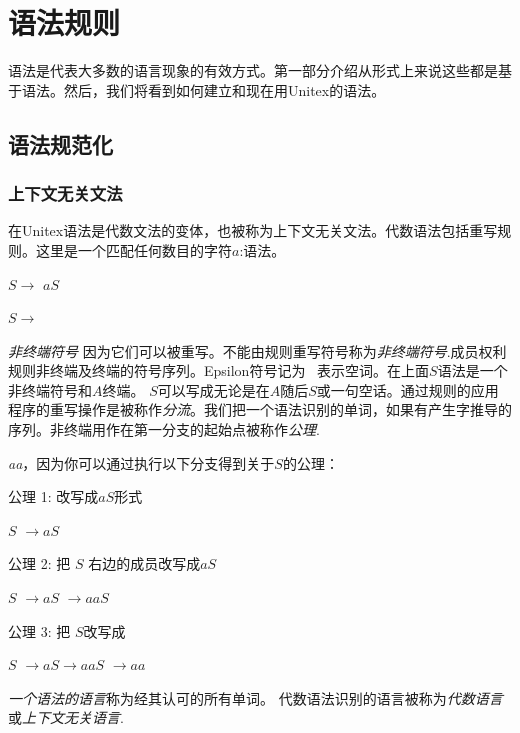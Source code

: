 \chapter{语法规则}
\label{chap-grammars}

语法是代表大多数的语言现象的有效方式。第一部分介绍从形式上来说这些都是基于语法。然后，我们将看到如何建立和现在用Unitex的语法。

\section{语法规范化}

\subsection{上下文无关文法}
在Unitex语法是代数文法的变体，也被称为上下文无关文法。代数语法包括重写规则。这里是一个匹配任何数目的字符$a$:语法。

\bigskip $S \rightarrow$ $aS$

$S \rightarrow$ \E

\bigskip
{}\textit{非终端符号}                                                                                       因为它们可以被重写。不能由规则重写符号称为\textit{非终端符号}.成员权利规则非终端及终端的符号序列。Epsilon符号记为\E ~ 表示空词。在上面$S$语法是一个非终端符号和$ A $终端。 $ S$可以写成无论是在$ A $随后$ S$或一句空话。通过规则的应用程序的重写操作是被称作\textit{分流}。我们把一个语法识别的单词，如果有产生字推导的序列。非终端用作在第一分支的起始点被称作\textit{公理}.


\bigskip
{} \textit{aa}，因为你可以通过执行以下分支得到关于$S$的公理：

\bigskip 公理 1: 改写成$aS$形式

\underline{$S$} $\rightarrow aS$

\bigskip 公理 2: 把 $S$ 右边的成员改写成$aS$

$S$ $\rightarrow a$\underline{$S$} $\rightarrow aaS$

\bigskip 公理 3: 把 $S$改写成 \E

$S$ $\rightarrow aS \rightarrow aa$\underline{$S$} $\rightarrow aa$

\bigskip
\noindent \textit{一个语法的语言}称为经其认可的所有单词。%
代数语法识别的语言被称为\textit{代数语言}或\textit{上下文无关语言}.


